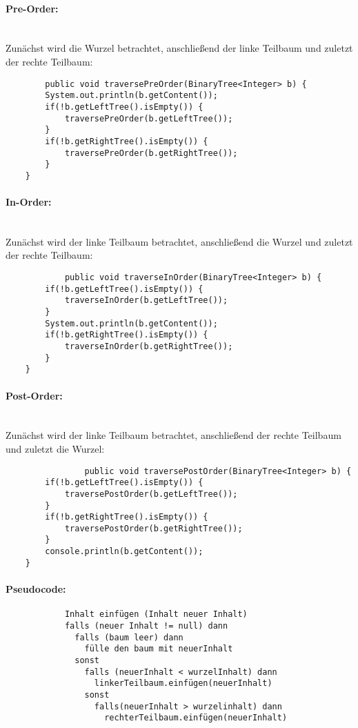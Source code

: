 \documentclass[a4paper, 12pt]{report}
\newenvironment{gblock}[1]{
    \tcolorbox[beamer,
        noparskip,
        colback=blue!25!,
        colbacklower=blue!75!blue,
        title=#1]}
{\endtcolorbox}
\begin{document}
	\begin{gblock}{Traversierungsverfahren}
		\paragraph{Pre-Order:} \mbox{} \\
		Zunächst wird die Wurzel betrachtet, anschließend der linke Teilbaum und zuletzt der rechte Teilbaum:
		\begin{verbatim}			
	    public void traversePreOrder(BinaryTree<Integer> b) {
        System.out.println(b.getContent());
        if(!b.getLeftTree().isEmpty()) {
            traversePreOrder(b.getLeftTree());
        }
        if(!b.getRightTree().isEmpty()) {
            traversePreOrder(b.getRightTree());
        }
    }
		\end{verbatim}

		\paragraph{In-Order:} \mbox{} \\
		Zunächst wird der linke Teilbaum betrachtet, anschließend die Wurzel und zuletzt der rechte Teilbaum:
		\begin{verbatim}
			public void traverseInOrder(BinaryTree<Integer> b) {
        if(!b.getLeftTree().isEmpty()) {
            traverseInOrder(b.getLeftTree());
        }
        System.out.println(b.getContent());
        if(!b.getRightTree().isEmpty()) {
            traverseInOrder(b.getRightTree());
        }
    }
		\end{verbatim}
		\paragraph{Post-Order:} \mbox{} \\
		Zunächst wird der linke Teilbaum betrachtet, anschließend der rechte Teilbaum und zuletzt die Wurzel:
		\begin{verbatim}
			    public void traversePostOrder(BinaryTree<Integer> b) {
        if(!b.getLeftTree().isEmpty()) {
            traversePostOrder(b.getLeftTree());
        }
        if(!b.getRightTree().isEmpty()) {
            traversePostOrder(b.getRightTree());
        }
        console.println(b.getContent());
    }
		\end{verbatim}
	\end{gblock}
	\vspace{1cm}
	\begin{gblock}{In einen Binären Suchbaum einfügen}
		\paragraph{Pseudocode:} 
		\begin{verbatim}
			Inhalt einfügen (Inhalt neuer Inhalt)
			falls (neuer Inhalt != null) dann
			  falls (baum leer) dann
			    fülle den baum mit neuerInhalt
			  sonst
			    falls (neuerInhalt < wurzelInhalt) dann
			      linkerTeilbaum.einfügen(neuerInhalt)
			    sonst
			      falls(neuerInhalt > wurzelinhalt) dann
			        rechterTeilbaum.einfügen(neuerInhalt)
		\end{verbatim}
	\end{gblock}
\end{document}
